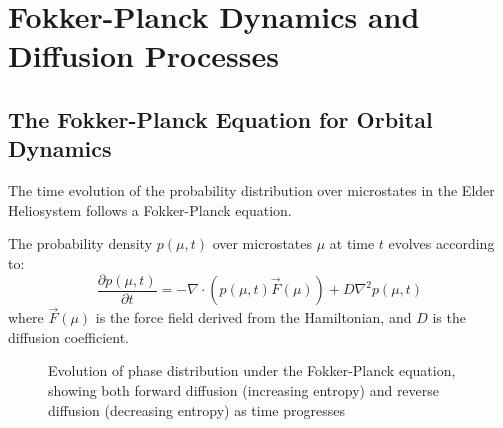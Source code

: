 \section{Fokker-Planck Dynamics and Diffusion Processes}

\subsection{The Fokker-Planck Equation for Orbital Dynamics}

The time evolution of the probability distribution over microstates in the Elder Heliosystem follows a Fokker-Planck equation.

\begin{theorem}
The probability density $p(\mu, t)$ over microstates $\mu$ at time $t$ evolves according to:
\begin{equation}
\frac{\partial p(\mu, t)}{\partial t} = -\nabla \cdot (p(\mu, t) \vec{F}(\mu)) + D \nabla^2 p(\mu, t)
\end{equation}
where $\vec{F}(\mu)$ is the force field derived from the Hamiltonian, and $D$ is the diffusion coefficient.
\end{theorem}

\begin{figure}[h]
\centering
{}
\caption{Evolution of phase distribution under the Fokker-Planck equation, showing both forward diffusion (increasing entropy) and reverse diffusion (decreasing entropy) as time progresses}
\label{fig:fokker_planck}
\end{figure}

